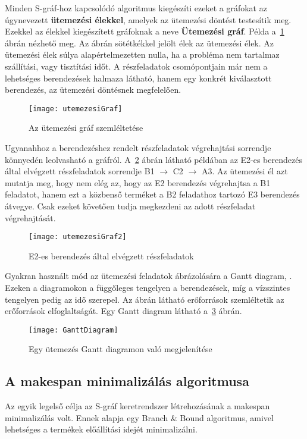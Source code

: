 Minden S-gráf-hoz kapcsolódó algoritmus kiegészíti ezeket a gráfokat az úgynevezett \textbf{ütemezési élekkel}, amelyek az ütemezési döntést testesítik meg. Ezekkel az élekkel kiegészített gráfoknak a neve \textbf{Ütemezési gráf}. Példa a~\ref{utemezesiGraf} ábrán nézhető meg. Az ábrán sötétkékkel jelölt élek az ütemezési élek. Az ütemezési élek súlya alapértelmezetten nulla, ha a probléma nem tartalmaz szállítási, vagy tisztítási időt. A részfeladatok csomópontjain már nem a lehetséges berendezések halmaza látható, hanem egy konkrét kiválasztott berendezés, az ütemezési döntésnek megfelelően. 
\begin{figure}[H]
\begin{center}
\texttt{[image: utemezesiGraf]}
\caption{Az ütemezési gráf szemléltetése}
\label{utemezesiGraf}
\end{center}
\end{figure}
Ugyanahhoz a berendezéshez rendelt részfeladatok végrehajtási sorrendje könnyedén leolvasható a gráfról. A~\ref{utemezesiGraf2} ábrán látható példában az E2-es berendezés által elvégzett részfeladatok sorrendje B1 $\to$ C2 $\to$ A3. Az ütemezési él azt mutatja meg, hogy nem elég az, hogy az E2 berendezés végrehajtsa a B1 feladatot, hanem ezt a közbenső terméket a B2 feladathoz tartozó E3 berendezés átvegye. Csak ezeket követően tudja megkezdeni az adott részfeladat végrehajtását.
\begin{figure}[H]
\begin{center}
\texttt{[image: utemezesiGraf2]}
\caption{E2-es berendezés által elvégzett részfeladatok}
\label{utemezesiGraf2}
\end{center}
\end{figure}
Gyakran használt mód az ütemezési feladatok ábrázolására a Gantt diagram\cite{ganttwwf}, \cite{ganttofw}. Ezeken a diagramokon a függőleges tengelyen a berendezések, míg a vízszintes tengelyen pedig az idő szerepel. Az ábrán látható erőforrások szemléltetik az erőforrások elfoglaltságát. Egy Gantt diagram látható a~\ref{GanttDiagram} ábrán.
\begin{figure}[H]
\begin{center}
\texttt{[image: GanttDiagram]}
\caption{Egy ütemezés Gantt diagramon való megjelenítése}
\label{GanttDiagram}
\end{center}
\end{figure}

\subsection{A makespan minimalizálás algoritmusa}
Az egyik legelső célja az S-gráf keretrendszer létrehozásának a makespan minimalizálás volt. Ennek alapja egy Branch \& Bound algoritmus, amivel lehetséges a termékek előállítási idejét minimalizálni.

